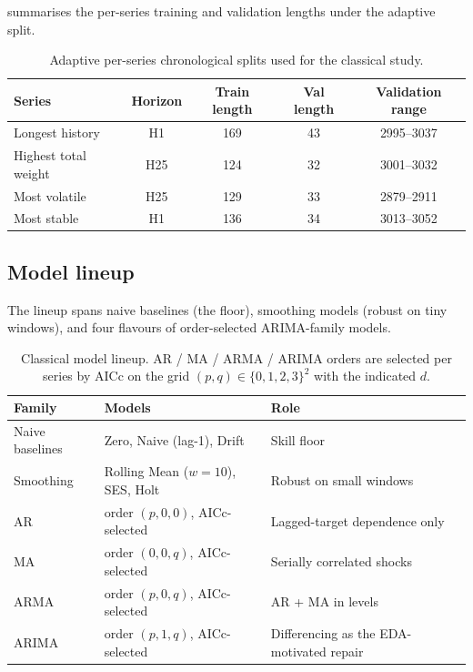  summarises the per-series training and validation lengths under the adaptive split.

\begin{table}[h]
\centering
\caption{Adaptive per-series chronological splits used for the classical study.}
\label{tab:classical_splits}
\begin{tabular}{l c c c c}
\toprule
Series & Horizon & Train length & Val length & Validation range \\
\midrule
Longest history     & H1  & 169 & 43 & 2995--3037 \\
Highest total weight & H25 & 124 & 32 & 3001--3032 \\
Most volatile       & H25 & 129 & 33 & 2879--2911 \\
Most stable         & H1  & 136 & 34 & 3013--3052 \\
\bottomrule
\end{tabular}
\end{table}

\subsection{Model lineup}
\label{sec:classical:lineup}

The lineup spans naive baselines (the floor), smoothing models (robust on tiny windows), and four flavours of order-selected ARIMA-family models.

\begin{table}[h]
\centering
\caption{Classical model lineup. AR / MA / ARMA / ARIMA orders are selected per series by AICc on the grid $(p,q) \in \{0,1,2,3\}^2$ with the indicated $d$.}
\label{tab:classical_lineup}
\begin{tabular}{l l l}
\toprule
Family & Models & Role \\
\midrule
Naive baselines & Zero, Naive (lag-1), Drift     & Skill floor \\
Smoothing       & Rolling Mean ($w{=}10$), SES, Holt & Robust on small windows \\
AR              & order $(p,0,0)$, AICc-selected     & Lagged-target dependence only \\
MA              & order $(0,0,q)$, AICc-selected     & Serially correlated shocks \\
ARMA            & order $(p,0,q)$, AICc-selected     & AR + MA in levels \\
ARIMA           & order $(p,1,q)$, AICc-selected     & Differencing as the EDA-motivated repair \\
\bottomrule
\end{tabular}
\end{table}

